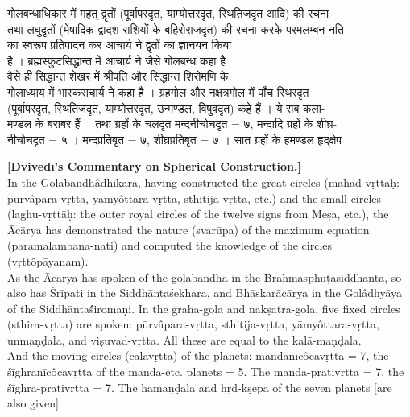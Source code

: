\documentclass[11pt,a4paper]{article}
\newcommand{\dev}[1]{{\devanagarifont #1}}
\newcommand{\bilingualpair}[2]{%
  \noindent%
  \begin{minipage}[t]{0.48\textwidth}
    #1%
  \end{minipage}%
  \hfill%
  \begin{minipage}[t]{0.48\textwidth}
    #2%
  \end{minipage}%
  \par\vspace{0.5em}%
}
\newenvironment{sanskritcol}{\devanagarifont\small}{}
\newenvironment{englishcol}{\iastfont\small}{}
\begin{document}
\vspace{0.5cm}
\bilingualpair{%
\begin{sanskritcol}
\dev{गोलबन्धाधिकार में महत् द्वृतों (पूर्वापरदृत, याम्योत्तरदृत, स्थितिजदृत आदि) की रचना}\\[0.3em]
\dev{तथा लघुदृतों (मेषादिक द्वादश राशियों के बहिरोराजदृत) की रचना करके परमलम्बन-नति}\\[0.3em]
\dev{का स्वरूप प्रतिपादन कर आचार्य ने द्वृतों का ज्ञानयन किया}\\[0.3em]
\dev{है । ब्रह्मस्फुटसिद्धान्त में आचार्य ने जैसे गोलबन्ध कहा है}\\[0.3em]
\dev{वैसे ही सिद्धान्त शेखर में श्रीपति और सिद्धान्त शिरोमणि के}\\[0.3em]
\dev{गोलाध्याय में भास्कराचार्य ने कहा है । ग्रहगोल और नक्षत्रगोल में पाँच स्थिरदृत}\\[0.3em]
\dev{(पूर्वापरदृत, स्थितिजदृत, याम्योत्तरदृत, उन्मण्डल, विषुवदृत) कहे हैं । ये सब कला-}\\[0.3em]
\dev{मण्डल के बराबर हैं । तथा ग्रहों के चलदृत मन्दनीचोचदृत = ७, मन्दादि ग्रहों के शीघ्र-}\\[0.3em]
\dev{नीचोचदृत = ५ । मन्दप्रतिबृत = ७, शीघ्रप्रतिबृत = ७ । सात ग्रहों के हमण्डल हृद्क्षेप}
\end{sanskritcol}%
}{%
\begin{englishcol}
\textbf{[Dvivedī's Commentary on Spherical Construction.]}\\[0.3em]
In the Golabandhâdhikāra, having constructed the great circles (mahad-vṛttāḥ: pūrvâpara-vṛtta, yāmyôttara-vṛtta, sthitija-vṛtta, etc.) and the small circles (laghu-vṛttāḥ: the outer royal circles of the twelve signs from Meṣa, etc.), the Ācārya has demonstrated the nature (svarūpa) of the maximum equation (paramalambana-nati) and computed the knowledge of the circles (vṛttôpāyanam).\\[0.3em]
As the Ācārya has spoken of the golabandha in the Brāhmasphuṭasiddhānta, so also has Śrīpati in the Siddhānta\'sek\-{}hara, and Bhāskarācārya in the Golâdhyāya of the Siddhānta\'śiro\-{}maṇi. In the graha-gola and nakṣatra-gola, five fixed circles (sthira-vṛtta) are spoken: pūrvâpara-vṛtta, sthitija-vṛtta, yāmyôttara-vṛtta, unmaṇḍala, and viṣuvad-vṛtta. All these are equal to the kalā-maṇḍala.\\[0.3em]
And the moving circles (calavṛtta) of the planets: mandanīcôcavṛtta = 7, the \'śīghranīcôcavṛtta of the manda-etc. planets = 5. The manda-prativṛtta = 7, the \'śīghra-prativṛtta = 7. The hamaṇḍala and hṛd-kṣepa of the seven planets [are also given].
\end{englishcol}%
}
\end{document}
